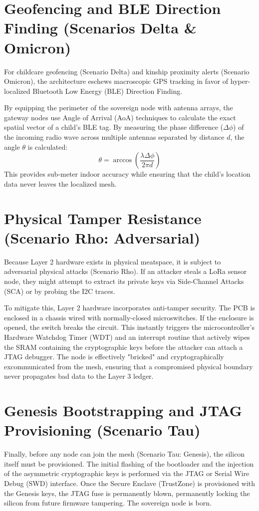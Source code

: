 \section{Geofencing and BLE Direction Finding (Scenarios Delta \& Omicron)}
For childcare geofencing (Scenario Delta) and kinship proximity alerts (Scenario Omicron), the architecture eschews macroscopic GPS tracking in favor of hyper-localized Bluetooth Low Energy (BLE) Direction Finding.

By equipping the perimeter of the sovereign node with antenna arrays, the gateway nodes use Angle of Arrival (AoA) techniques to calculate the exact spatial vector of a child's BLE tag. By measuring the phase difference ($\Delta \phi$) of the incoming radio wave across multiple antennas separated by distance $d$, the angle $\theta$ is calculated:
\begin{equation}
\theta = \arccos \left( \frac{\lambda \Delta \phi}{2\pi d} \right)
\end{equation}
This provides sub-meter indoor accuracy while ensuring that the child's location data never leaves the localized mesh.

\section{Physical Tamper Resistance (Scenario Rho: Adversarial)}
Because Layer 2 hardware exists in physical meatspace, it is subject to adversarial physical attacks (Scenario Rho). If an attacker steals a LoRa sensor node, they might attempt to extract its private keys via Side-Channel Attacks (SCA) or by probing the I2C traces.

To mitigate this, Layer 2 hardware incorporates anti-tamper security. The PCB is enclosed in a chassis wired with normally-closed microswitches. If the enclosure is opened, the switch breaks the circuit. This instantly triggers the microcontroller's Hardware Watchdog Timer (WDT) and an interrupt routine that actively wipes the SRAM containing the cryptographic keys before the attacker can attach a JTAG debugger. The node is effectively "bricked" and cryptographically excommunicated from the mesh, ensuring that a compromised physical boundary never propagates bad data to the Layer 3 ledger.

\section{Genesis Bootstrapping and JTAG Provisioning (Scenario Tau)}
Finally, before any node can join the mesh (Scenario Tau: Genesis), the silicon itself must be provisioned. The initial flashing of the bootloader and the injection of the asymmetric cryptographic keys is performed via the JTAG or Serial Wire Debug (SWD) interface. Once the Secure Enclave (TrustZone) is provisioned with the Genesis keys, the JTAG fuse is permanently blown, permanently locking the silicon from future firmware tampering. The sovereign node is born.

